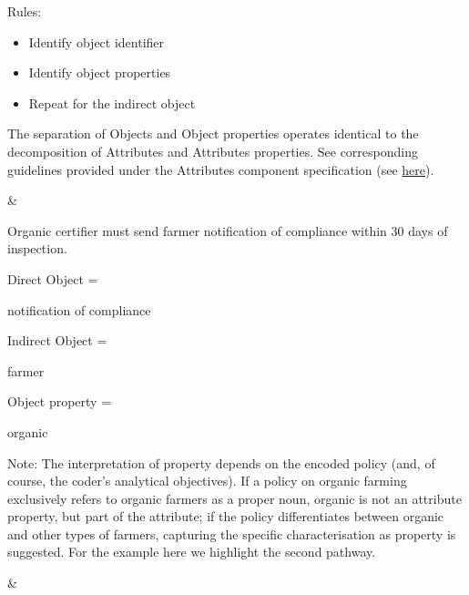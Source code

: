 \begin{landscape}
\begin{longtable}{\tabledims}
{\vspace{0.2cm}

Rules:
\begin{itemize}
    \item Identify object identifier
    \item Identify object properties
    \item Repeat for the indirect object
\end{itemize}

 The separation of Objects and Object properties operates identical to the decomposition of Attributes and Attributes properties. See corresponding guidelines provided under the Attributes component specification (see \hyperlink{tablink:AttributePropertyHeuristics}{here}).} & 

{

\begin{exi}Organic certifier must send farmer notification of compliance within 30 days of inspection.\end{exi}

\vspace{0.5cm}

{Direct Object = \begin{exi}notification of compliance\end{exi}}

\vspace{0.5cm}

{Indirect Object = \begin{exi}farmer\end{exi}}

\vspace{0.5cm}

{Object property = \begin{exi}organic\end{exi}}

\vspace{0.5cm}

Note: The interpretation of property depends on the encoded policy (and, of course, the coder’s analytical objectives). If a policy on organic farming exclusively refers to organic farmers as a proper noun, organic is not an attribute property, but part of the attribute; if the policy differentiates between organic and other types of farmers, capturing the specific characterisation as property is suggested. For the example here we highlight the second pathway.

} &


\end{longtable}
\end{landscape}
